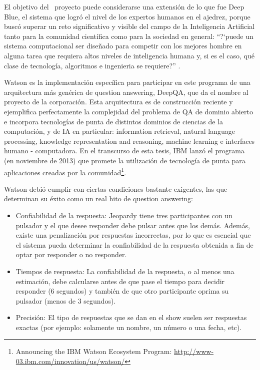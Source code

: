 El objetivo del \ proyecto puede considerarse una extensión de lo que
fue Deep Blue, el sistema que logró el nivel de los expertos humanos
en el ajedrez, porque buscó superar un reto  significativo y
visible del campo de la Inteligencia Artificial tanto para la comunidad
científica como para la sociedad en general:
{\textquotedblleft}?`puede un sistema computacional ser diseñado para
competir con los mejores hombre en alguna tarea que requiera altos
niveles de inteligencia humana y, si es el caso, qué clase de
tecnología, algoritmos e ingenieria se
requiere?{\textquotedblright} \cite{WATSON1}.

Watson es la implementación específica para participar en este
programa de una arquitectura más genérica de question answering,
DeepQA, que da el nombre al proyecto de la corporación. Esta
arquitectura es de construcción reciente y ejemplifica perfectamente la complejidad del problema de
QA de dominio abierto e incorpora tecnologías de punta de distintos
dominios de ciencias de la computación, y de IA en particular:
information retrieval, natural language processing, knowledge
representation and reasoning, machine learning e interfaces humano -
computadora. En el transcurso de esta tesis, IBM lanzó el programa
 (en noviembre de 2013) que promete la utilización
de tecnología de punta para aplicaciones creadas por la comunidad\footnote{
Announcing the IBM Watson Ecosystem Program: \url{http://www-03.ibm.com/innovation/us/watson/}}.

Watson debió cumplir con ciertas condiciones bastante exigentes, las que determinan su éxito como un real hito de question answering:


\begin{itemize}
\item Confiabilidad de la respuesta: \newline
Jeopardy tiene tres participantes con un pulsador y el que desee
responder debe pulsar antes que los demás. Además, existe una
penalización por respuestas incorrectas, por lo que es esencial que
el sistema pueda determinar la confiabilidad de la respuesta obtenida a
fin de optar por responder o no responder.
\item Tiempos de respuesta: \newline
La confiabilidad de la respuesta, o al menos una estimación, debe
calcularse antes de que pase el tiempo para decidir responder (6
segundos) y también de que otro participante oprima su pulsador
(menos de 3 segundos).
\item Precisión:\newline
El tipo de respuestas que se dan en el show suelen ser respuestas
exactas (por ejemplo: solamente un nombre, un número o una fecha,
etc). 
\end{itemize}

